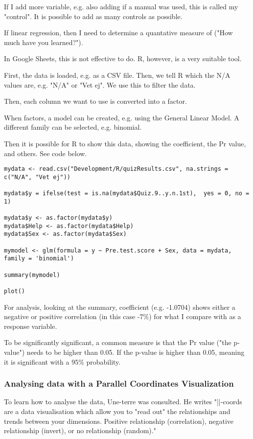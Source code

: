 If I add more variable, e.g. also adding if a manual was used, this is called my "control". It is possible to add as many controls as possible.

If linear regression, then I need to determine a quantative measure of ("How much have you learned?").

In Google Sheets, this is not effective to do. R, however, is a very suitable tool.

First, the data is loaded, e.g. as a CSV file. Then, we tell R which the N/A values are, e.g. "N/A" or "Vet ej". We use this to filter the data.

Then, each column we want to use is converted into a factor.

When factors, a model can be created, e.g. using the General Linear Model. A different family can be selected, e.g. binomial.

Then it is possible for R to show this data, showing the coefficient, the Pr value, and others. See code below.

\begin{verbatim}
mydata <- read.csv("Development/R/quizResults.csv", na.strings = c("N/A", "Vet ej"))

mydata$y = ifelse(test = is.na(mydata$Quiz.9..y.n.1st),  yes = 0, no = 1)

mydata$y <- as.factor(mydata$y)
mydata$Help <- as.factor(mydata$Help)
mydata$Sex <- as.factor(mydata$Sex)

mymodel <- glm(formula = y ~ Pre.test.score + Sex, data = mydata, family = 'binomial')

summary(mymodel)

plot()
\end{verbatim}

For analysis, looking at the summary, coefficient (e.g. -1.0704) shows either a negative or positive correlation (in this case -7\%) for what I compare with as a response variable.

To be significantly significant, a common measure is that the Pr value ("the p-value") needs to be higher than 0.05. If the p-value is higher than 0.05, meaning it is significant with a 95\% probability.

\subsubsection{Analysing data with a Parallel Coordinates Visualization}

To learn how to analyse the data, Une-terre \cite{une-terre} was consulted. %
He writes "||-coords are a data visualisation which allow you to "read out" the relationships and trends between your dimensions. Positive relationship (correlation), negative relationship (invert), or no relationship (random)."
